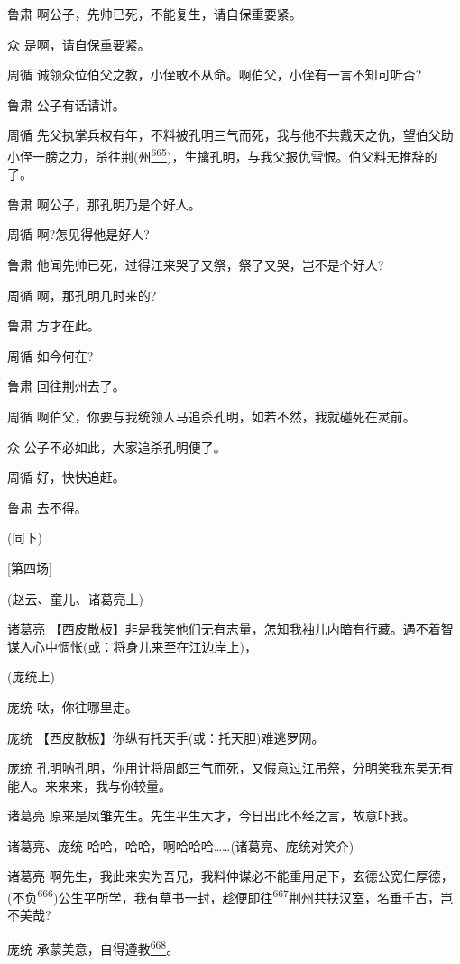 鲁肃 啊公子，先帅已死，不能复生，请自保重要紧。

众 是啊，请自保重要紧。

周循 诚领众位伯父之教，小侄敢不从命。啊伯父，小侄有一言不知可听否?

鲁肃 公子有话请讲。

周循
先父执掌兵权有年，不料被孔明三气而死，我与他不共戴天之仇，望伯父助小侄一膀之力，杀往荆(州\protect\hyperlink{fn665}{\textsuperscript{665}})，生擒孔明，与我父报仇雪恨。伯父料无推辞的了。

鲁肃 啊公子，那孔明乃是个好人。

周循 啊?怎见得他是好人?

鲁肃 他闻先帅已死，过得江来哭了又祭，祭了又哭，岂不是个好人?

周循 啊，那孔明几时来的?

鲁肃 方才在此。

周循 如今何在?

鲁肃 回往荆州去了。

周循 啊伯父，你要与我统领人马追杀孔明，如若不然，我就碰死在灵前。

众 公子不必如此，大家追杀孔明便了。

周循 好，快快追赶。

鲁肃 去不得。

(同下)

{[}第四场{]}

(赵云、童儿、诸葛亮上)

诸葛亮
【西皮散板】非是我笑他们无有志量，怎知我袖儿内暗有行藏。{遇不着智谋人心中惆怅}(或：将身儿来至在江边岸上)，

(庞统上)

庞统 呔，你往哪里走。

庞统 【西皮散板】你纵有托天手(或：托天胆)难逃罗网。

庞统
孔明呐孔明，你用计将周郎三气而死，又假意过江吊祭，分明笑我东吴无有能人。来来来，我与你较量。

诸葛亮 原来是凤雏先生。先生平生大才，今日出此不经之言，故意吓我。

诸葛亮、庞统 哈哈，哈哈，啊哈哈哈\ldots{}\ldots{}(诸葛亮、庞统对笑介)

诸葛亮
啊先生，我此来实为吾兄，我料仲谋必不能重用足下，玄德公宽仁厚德，(不负\protect\hyperlink{fn666}{\textsuperscript{666}})公生平所学，我有草书一封，趁便即往\protect\hyperlink{fn667}{\textsuperscript{667}}荆州共扶汉室，名垂千古，岂不美哉?

庞统
承蒙美意，自得遵教\protect\hyperlink{fn668}{\textsuperscript{668}}。

